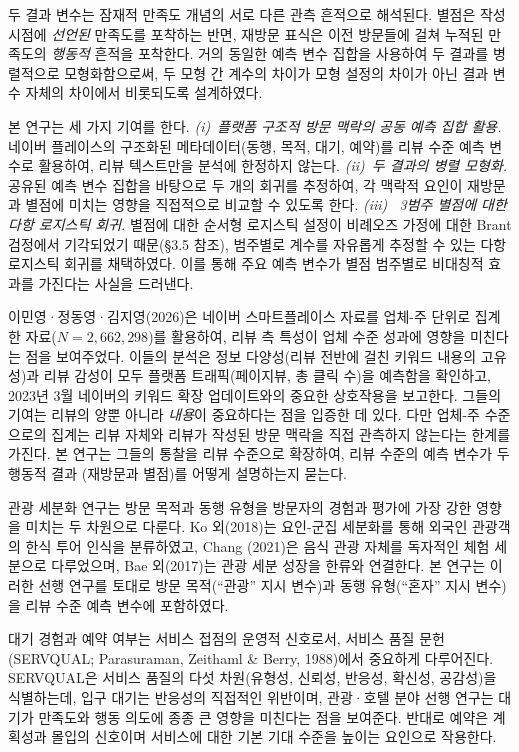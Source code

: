 \documentclass[10pt,a4paper]{article}
\newcommand{\sect}[1]{\vspace{10pt}\noindent{\Large\bfseries #1}\par\vspace{3pt}}
\newcommand{\subsect}[1]{\vspace{6pt}\noindent{\large\bfseries #1}\par\vspace{2pt}}
\begin{document}
두 결과 변수는 잠재적 만족도 개념의 서로 다른 관측 흔적으로 해석된다.
별점은 작성 시점에 \emph{선언된} 만족도를 포착하는 반면, 재방문 표식은
이전 방문들에 걸쳐 누적된 만족도의 \emph{행동적} 흔적을 포착한다. 거의
동일한 예측 변수 집합을 사용하여 두 결과를 병렬적으로 모형화함으로써,
두 모형 간 계수의 차이가 모형 설정의 차이가 아닌 결과 변수 자체의
차이에서 비롯되도록 설계하였다.

\subsect{1.3 연구 기여}
본 연구는 세 가지 기여를 한다. \emph{(i)~플랫폼 구조적 방문 맥락의
공동 예측 집합 활용.} 네이버 플레이스의 구조화된 메타데이터(동행, 목적,
대기, 예약)를 리뷰 수준 예측 변수로 활용하여, 리뷰 텍스트만을 분석에
한정하지 않는다. \emph{(ii)~두 결과의 병렬 모형화.} 공유된 예측 변수
집합을 바탕으로 두 개의 회귀를 추정하여, 각 맥락적 요인이 재방문과
별점에 미치는 영향을 직접적으로 비교할 수 있도록 한다. \emph{(iii)~
3범주 별점에 대한 다항 로지스틱 회귀.} 별점에 대한 순서형 로지스틱
설정이 비례오즈 가정에 대한 Brant 검정에서 기각되었기 때문(\S3.5
참조), 범주별로 계수를 자유롭게 추정할 수 있는 다항 로지스틱 회귀를
채택하였다. 이를 통해 주요 예측 변수가 별점 범주별로 비대칭적 효과를
가진다는 사실을 드러낸다.

\sect{II. 이론적 배경}

\subsect{2.1 방문 맥락과 리뷰 행동}
이민영·정동영·김지영(2026)은 네이버 스마트플레이스 자료를 업체-주
단위로 집계한 자료($N = 2{,}662{,}298$)를 활용하여, 리뷰 측 특성이
업체 수준 성과에 영향을 미친다는 점을 보여주었다. 이들의 분석은 정보
다양성(리뷰 전반에 걸친 키워드 내용의 고유성)과 리뷰 감성이 모두
플랫폼 트래픽(페이지뷰, 총 클릭 수)을 예측함을 확인하고, 2023년 3월
네이버의 키워드 확장 업데이트와의 중요한 상호작용을 보고한다. 그들의
기여는 리뷰의 양뿐 아니라 \emph{내용}이 중요하다는 점을 입증한 데
있다. 다만 업체-주 수준으로의 집계는 리뷰 자체와 리뷰가 작성된 방문
맥락을 직접 관측하지 않는다는 한계를 가진다. 본 연구는 그들의 통찰을
리뷰 수준으로 확장하여, 리뷰 수준의 예측 변수가 두 행동적 결과
(재방문과 별점)를 어떻게 설명하는지 묻는다.

관광 세분화 연구는 방문 목적과 동행 유형을 방문자의 경험과 평가에
가장 강한 영향을 미치는 두 차원으로 다룬다. Ko 외(2018)는 요인-군집
세분화를 통해 외국인 관광객의 한식 투어 인식을 분류하였고, Chang
(2021)은 음식 관광 자체를 독자적인 체험 세분으로 다루었으며, Bae
외(2017)는 관광 세분 성장을 한류와 연결한다. 본 연구는 이러한 선행
연구를 토대로 방문 목적(``관광'' 지시 변수)과 동행 유형(``혼자''
지시 변수)을 리뷰 수준 예측 변수에 포함하였다.

대기 경험과 예약 여부는 서비스 접점의 운영적 신호로서, 서비스 품질
문헌(SERVQUAL; Parasuraman, Zeithaml \& Berry, 1988)에서 중요하게
다루어진다. SERVQUAL은 서비스 품질의 다섯 차원(유형성, 신뢰성, 반응성,
확신성, 공감성)을 식별하는데, 입구 대기는 반응성의 직접적인 위반이며,
관광·호텔 분야 선행 연구는 대기가 만족도와 행동 의도에 종종 큰 영향을
미친다는 점을 보여준다. 반대로 예약은 계획성과 몰입의 신호이며 서비스에
대한 기본 기대 수준을 높이는 요인으로 작용한다.
\end{document}

